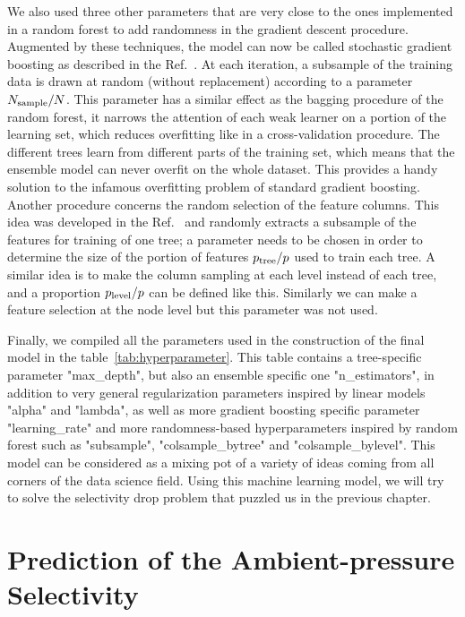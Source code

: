 \documentclass[main]{subfiles}
\begin{document}
We also used three other parameters that are very close to the ones implemented in a random forest to add randomness in the gradient descent procedure. Augmented by these techniques, the model can now be called stochastic gradient boosting as described in the Ref.~\cite{Friedman2002}. At each iteration, a subsample of the training data is drawn at random (without replacement) according to a parameter $N_{\text{sample}}/N$. This parameter has a similar effect as the bagging procedure of the random forest, it narrows the attention of each weak learner on a portion of the learning set, which reduces overfitting like in a cross-validation procedure. The different trees learn from different parts of the training set, which means that the ensemble model can never overfit on the whole dataset. This provides a handy solution to the infamous overfitting problem of standard gradient boosting. Another procedure concerns the random selection of the feature columns. This idea was developed in the Ref.~\cite{Tin_Kam_Ho_1998} and randomly extracts a subsample of the features for training of one tree; a parameter needs to be chosen in order to determine the size of the portion of features $p_{\text{tree}}/p$ used to train each tree. A similar idea is to make the column sampling at each level instead of each tree, and a proportion $p_{\text{level}}/p$ can be defined like this. Similarly we can make a feature selection at the node level but this parameter was not used. 

Finally, we compiled all the parameters used in the construction of the final model in the table~\ref{tab:hyperparameter}. This table contains a tree-specific parameter "max\_depth", but also an ensemble specific one "n\_estimators", in addition to very general regularization parameters inspired by linear models "alpha" and "lambda", as well as more gradient boosting specific parameter "learning\_rate" and more randomness-based hyperparameters inspired by random forest such as "subsample", "colsample\_bytree" and "colsample\_bylevel". This model can be considered as a mixing pot of a variety of ideas coming from all corners of the data science field. Using this machine learning model, we will try to solve the selectivity drop problem that puzzled us in the previous chapter.

\section{Prediction of the Ambient-pressure Selectivity}
\end{document}
